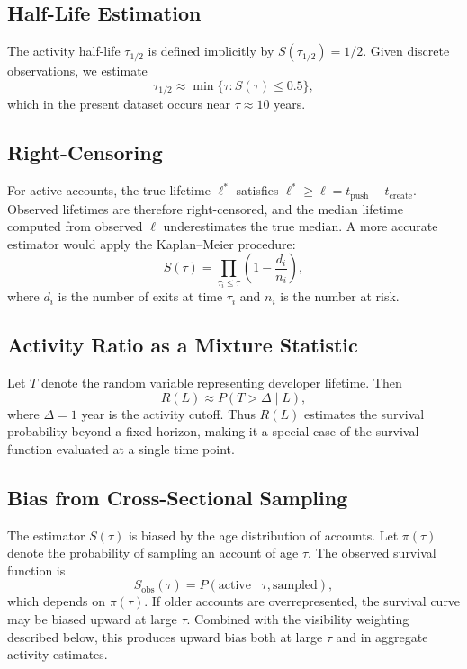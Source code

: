 \documentclass[12pt,a4paper]{article}
\begin{document}
\subsection{Half-Life Estimation}

The activity half-life $\tau_{1/2}$ is defined implicitly by $S(\tau_{1/2}) = 1/2$. Given discrete observations, we estimate
\[
\tau_{1/2} \approx \min\{\tau : S(\tau) \leq 0.5\},
\]
which in the present dataset occurs near $\tau \approx 10$ years.

\subsection{Right-Censoring}

For active accounts, the true lifetime $\ell^*$ satisfies $\ell^* \geq \ell = t_{\text{push}} - t_{\text{create}}$. Observed lifetimes are therefore right-censored, and the median lifetime computed from observed $\ell$ underestimates the true median. A more accurate estimator would apply the Kaplan--Meier procedure:
\[
\hat{S}(\tau) = \prod_{\tau_i \leq \tau} \left(1 - \frac{d_i}{n_i}\right),
\]
where $d_i$ is the number of exits at time $\tau_i$ and $n_i$ is the number at risk.

\subsection{Activity Ratio as a Mixture Statistic}

Let $T$ denote the random variable representing developer lifetime. Then
\[
R(L) \approx P(T > \Delta \mid L),
\]
where $\Delta = 1$ year is the activity cutoff. Thus $R(L)$ estimates the survival probability beyond a fixed horizon, making it a special case of the survival function evaluated at a single time point.

\subsection{Bias from Cross-Sectional Sampling}

The estimator $S(\tau)$ is biased by the age distribution of accounts. Let $\pi(\tau)$ denote the probability of sampling an account of age $\tau$. The observed survival function is
\[
S_{\text{obs}}(\tau) = P(\text{active} \mid \tau, \text{sampled}),
\]
which depends on $\pi(\tau)$. If older accounts are overrepresented, the survival curve may be biased upward at large $\tau$. Combined with the visibility weighting described below, this produces upward bias both at large $\tau$ and in aggregate activity estimates.
\end{document}
